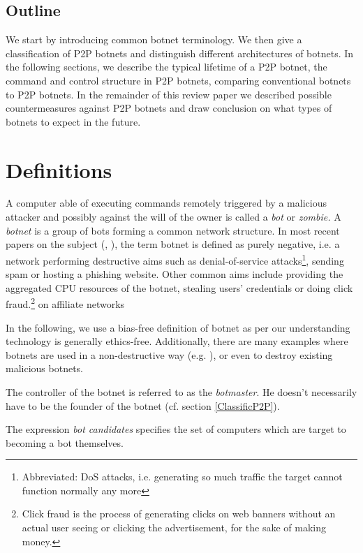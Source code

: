 \documentclass{llncs}
\begin{document}
\subsection*{Outline}
We start by introducing common botnet terminology. We then give a
classification of P2P botnets and distinguish different architectures
of botnets. In the following sections, we describe the typical
lifetime of a P2P botnet, the command and control structure in P2P
botnets, comparing conventional botnets to P2P botnets. In the
remainder of this review paper we described possible countermeasures
against P2P botnets and draw conclusion on what types of botnets to
expect in the future.


\section{Definitions}
A computer able of executing commands remotely triggered by a
malicious attacker and possibly against the will of the owner is
called a {\it bot} or {\it zombie.} A {\it botnet} is a group of bots
forming a common network structure.\cite{schoof2007detecting} In most
recent papers on the subject (\cite{wang2009systematic},
\cite{abu2006multifaceted}), the term botnet is defined as purely
negative, i.e. a network performing destructive aims such as
denial-of-service attacks\footnote{Abbreviated: DoS attacks,
  i.e. generating so much traffic the target cannot function normally
  any more}, sending spam or hosting a phishing
website\cite{steggink2007detection}. Other common aims include
providing the aggregated CPU resources of the botnet, stealing users'
credentials \cite{borgaonkar2010analysis} or doing click
fraud.\footnote{Click fraud is the process of generating clicks on web
  banners without an actual user seeing or clicking the advertisement,
  for the sake of making money.} on affiliate
networks\cite{clickFraud}

In the following, we use a bias-free definition of botnet as per
our understanding technology is generally ethics-free. Additionally,
there are many examples where botnets are used in a non-destructive
way (e.g. \cite{seti}), or even to destroy existing malicious botnets.

The controller of the botnet is referred to as the {\it
  botmaster}. He doesn't necessarily have to be the founder of the
botnet (cf. section \ref{ClassificP2P}).

The expression {\it bot candidates} specifies the set of computers
which are target to becoming a bot themselves.
\end{document}
